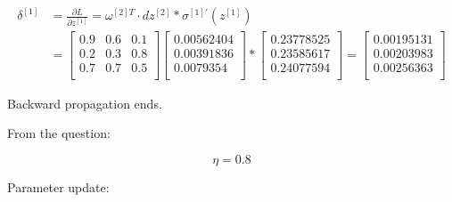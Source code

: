 \documentclass{article}
\begin{document}
\[
    \begin{aligned}
        \delta^{[1]} & = \frac{\partial L}{\partial z^{[1]}} = \omega^{[2]T}\cdot dz^{[2]}*\sigma^{[1]'}(z^{[1]}) \\
                     & = \begin{bmatrix}
                             0.9 & 0.6 & 0.1 \\
                             0.2 & 0.3 & 0.8 \\
                             0.7 & 0.7 & 0.5 \\
                         \end{bmatrix}
        \begin{bmatrix}
            0.00562404 \\
            0.00391836 \\
            0.0079354  \\
        \end{bmatrix}
        * \begin{bmatrix}
              0.23778525 \\
              0.23585617 \\
              0.24077594 \\
          \end{bmatrix}
        = \begin{bmatrix}
              0.00195131 \\
              0.00203983 \\
              0.00256363 \\
          \end{bmatrix}
    \end{aligned}
\]

Backward propagation ends.

From the question:

\[
    \eta = 0.8
\]

Parameter update:
\end{document}
